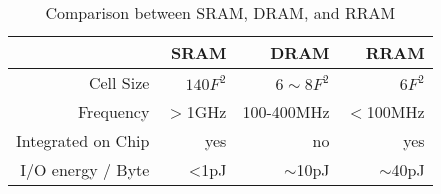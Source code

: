 \begin{table}[htbp]
    \centering
    \caption{Comparison between SRAM, DRAM, and RRAM}
    \vspace{-5pt}
      \begin{tabular}{|r|r|r|r|}
      \hline
            & SRAM  & DRAM  & RRAM \\
      \hline
      Cell Size & $140F^2$ & $6\sim8F^2$ & $6F^2$ \\
      \hline
      Frequency & $>$1GHz & 100-400MHz & $<$100MHz \\
      \hline
      Integrated on Chip & yes   & no    & yes \\
      \hline
      I/O energy / Byte & <1pJ   & $\sim$10pJ  & $\sim$40pJ \\
      \hline
      \end{tabular}
    \label{tab:ram}
\end{table}